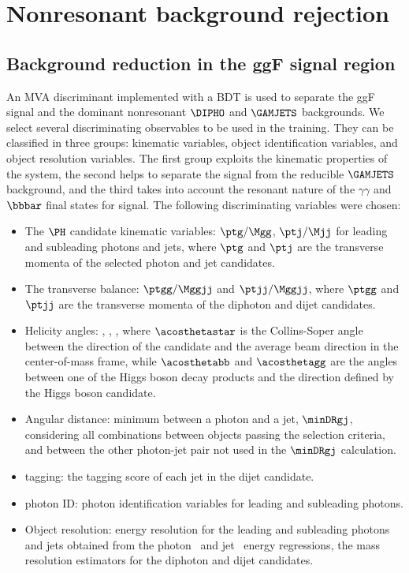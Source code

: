 \documentclass[11pt,a4paper,cmspaper,final,collab]{cms-tdr}
\begin{document}
\section{Nonresonant background rejection}\label{sec:bkg_rej}
\subsection{Background reduction in the ggF \texorpdfstring{\HH}{HH} signal region}
\label{sec:background_ggf}
An MVA discriminant implemented with a BDT is used to separate the ggF \HH signal and the dominant nonresonant $\DIPHO$ and $\GAMJETS$ backgrounds. We select several discriminating observables to be used in the training. They can be classified in three groups: kinematic variables, object identification variables, and object resolution variables. The first group exploits the kinematic properties of the \HH system, the second helps to separate the signal from the reducible $\GAMJETS$ background, and the third takes into account the
resonant nature of the $\gamma\gamma$ and $\bbbar$ final states for signal. The following discriminating variables were chosen: 

\begin{itemize}
\item The $\PH$ candidate kinematic variables: $\ptg/\Mgg$, $\ptj/\Mjj$ for leading and subleading photons and jets, where $\ptg$ and $\ptj$ are the transverse momenta of the selected photon and jet candidates.
\item The \HH transverse balance: $\ptgg/\Mggjj$ and $\ptjj/\Mggjj$, where $\ptgg$ and $\ptjj$ are the transverse momenta of the diphoton and dijet candidates.
\item Helicity angles: \acosthetastar, \acosthetabb, \acosthetagg, where $\acosthetastar$ is the Collins-Soper angle~\cite{PhysRevD.16.2219} between the direction of the \Hgg candidate and the average beam direction in the \HH center-of-mass frame, while $\acosthetabb$ and $\acosthetagg$ are the angles between one of the Higgs boson decay products and the direction defined by the Higgs boson candidate.
\item Angular distance: minimum \DRgj between a photon and a jet, $\minDRgj$, considering all combinations between objects passing the selection criteria, and \DRgj between the other photon-jet pair not used in the $\minDRgj$ calculation. 
\item {\cPqb} tagging: the {\cPqb} tagging score of each jet in the dijet candidate.
\item photon ID: photon identification variables for leading and subleading photons.
\item Object resolution: energy resolution for the leading and subleading photons and jets obtained from the photon~\cite{Sirunyan:2018ouh} and {\cPqb} jet~\cite{Sirunyan:2019wwa} energy regressions, the mass resolution estimators for the diphoton and dijet candidates.
\end{itemize}
\end{document}
